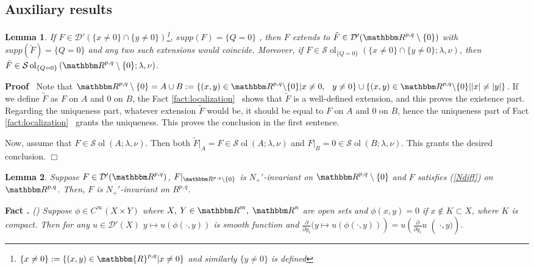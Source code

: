 \documentclass{article}
\newcommand{\assign}{:=}
\newcommand{\nin}{\not\in}
\newcommand{\tmop}[1]{\ensuremath{\operatorname{#1}}}
\newcommand{\tmtextbf}[1]{{\bfseries{#1}}}
\newcommand{\tmtextit}[1]{{\itshape{#1}}}
\newcommand{\tmtextup}[1]{{\upshape{#1}}}
\newenvironment{proof}{\noindent\textbf{Proof\ }}{\hspace*{\fill}$\Box$\medskip}
\numberwithin{definition}{section}
\newtheorem{lemma}{Lemma}
\numberwithin{lemma}{section}
\numberwithin{proposition}{section}
{\theorembodyfont{\rmfamily}\newtheorem{remark}{Remark}
\numberwithin{remark}{section}
}
\newcommand{\D}{\mathcal{D}} \newcommand{\supp}{supp}
\newcommand{\proofexplanation}[1]{(#1)}
\begin{document}
\subsection{Auxiliary results}

\begin{lemma}
  \label{lem:sing-q-3}If $F \in \D' ( \{ x \neq 0 \} \cap \{ y \neq 0
  \})${\footnote{$\{ x \neq 0 \} \assign \{ ( x, y) \in \mathbbm{R}^{p, q} | x
  \neq 0 \}$ and similarly $\{ y \neq 0 \}$ is defined}}, $\supp (F) = \{ Q =
  0 \}$ , then $F$ extends to $\tilde{F} \in \D' ( \R^{p, q} \setminus \{ 0
  \})$ with $\supp ( \tilde{F}) = \{ Q = 0 \}$ and any two such extensions
  would coincide. Moreover, if $F \in \mathcal{S} \tmop{ol}_{\{ Q = 0 \}} ( \{
  x \neq 0 \} \cap \{ y \neq 0 \} ; \lambda, \nu)$, then $\tilde{F} \in
  \mathcal{S} \tmop{ol}_{\{ Q = 0 \}} \left( \R^{p, q} \setminus \{ 0 \} ;
  \lambda, \nu \right)$.
\end{lemma}

\begin{proof}
  Note that $\R^{p, q} \setminus \{ 0 \} = A \cup B \assign \{ (x, y) \in
  \R^{p, q} \backslash \{ 0 \} |x \neq 0, \hspace{0.75em} y \neq 0\} \cup \{
  (x, y) \in \R^{p, q} \backslash \{ 0 \} | | x | \neq | y | \}$. If we define
  $\tilde{F}$ as $F$ on $A$ and 0 on $B$, the Fact \ref{fact:localization} \
  shows that $\tilde{F}$ is a well-defined extension, and this proves the
  existence part. Regarding the uniqueness part, whatever extension
  $\tilde{F}$ would be, it should be equal to $F$ on $A$ and 0 on $B$, hence
  the uniqueness part of Fact \ref{fact:localization} \ grants the uniqueness.
  This proves the conclusion in the first sentence.
  
  Now, assume that $F \in \mathcal{S} \tmop{ol} (A ; \lambda, \nu)$. Then both
  $\tilde{F} |_A = F \in \mathcal{S} \tmop{ol} (A ; \lambda, \nu)$ and $F |_B
  = 0 \in \mathcal{S} \tmop{ol} (B ; \lambda, \nu)$. This grants the desired
  conclusion.
\end{proof}

\begin{lemma}
  \label{supp-Q:lem-sing-q-4}Suppose $F \in \D' ( \R^{p, q})$, $F |_{\R^{p, q}
  \setminus \{ 0 \}}$ is $N_+'$-invariant on $\R^{p, q} \setminus \{ 0 \}$ and
  $F$ satisfies (\ref{Ndiff}) on $\R^{p, q}$. Then, $F$ is $N_+'$-invariant on
  $R^{p, q}$.
\end{lemma}

{\noindent}\tmtextbf{Fact \tmtextup{16}.
}\tmtextit{\label{fact:sing-q-2}{\proofexplanation{{\cite[Thm
2.1.3]{hormander1983analysis}}}} Suppose $\phi \in C^{\infty}  (X \times Y)$
where $X, \hspace{0.25em} Y \in \R^m, \hspace{0.25em} \R^n$ are open sets and
$\phi (x, y) = 0$ if $x \nin K \subset X$, where $K$ is compact. Then for any
$u \in \D' (X)$ $y \mapsto u (\phi ( \cdot, y))$ is smooth function and
$\left. \left. \frac{\partial}{\partial y_i}  ( y \mapsto u (\phi (\cdot, y))
\right) = u \left( \frac{\partial}{\partial y_i} u \right( \cdot, y)
\right)$.}{\hspace*{\fill}}{\medskip}
\end{document}

